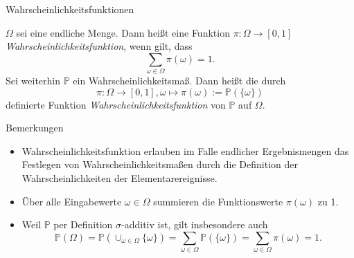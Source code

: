 \documentclass[
  8pt,
  ignorenonframetext,
]{beamer}
\providecommand{\tightlist}{%
  \setlength{\itemsep}{0pt}\setlength{\parskip}{0pt}}
\begin{document}
\begin{frame}{Wahrscheinlichkeitsfunktionen}
\protect\hypertarget{wahrscheinlichkeitsfunktionen}{}
\small
\begin{definition}[Wahrscheinlichkeitsfunktion]
\justifying
$\Omega$ sei eine endliche Menge. Dann heißt eine Funktion $\pi:\Omega \to [0,1]$
\textit{Wahrscheinlichkeitsfunktion}, wenn gilt, dass
\begin{equation}
\sum_{\omega \in \Omega} \pi(\omega) = 1.
\end{equation}
Sei weiterhin $\mathbb{P}$ ein Wahrscheinlichkeitsmaß. Dann heißt die durch
\begin{equation}
\pi : \Omega \to [0,1], \omega \mapsto \pi(\omega) := \mathbb{P}(\{\omega\})
\end{equation}
definierte Funktion \textit{Wahrscheinlichkeitsfunktion} von $\mathbb{P}$ auf $\Omega$.
\end{definition}
\footnotesize

Bemerkungen

\begin{itemize}
\tightlist
\item
  \justifying Wahrscheinlichkeitsfunktion erlauben im Falle endlicher
  Ergebnismengen das Festlegen von Wahrscheinlichkeitsmaßen durch die
  Definition der Wahrscheinlichkeiten der Elementarereignisse.
\item
  Über alle Eingabewerte \(\omega \in \Omega\) summieren die
  Funktionswerte \(\pi(\omega)\) zu 1.
\item
  Weil \(\mathbb{P}\) per Definition \(\sigma\)-additiv ist, gilt
  insbesondere auch \begin{equation}
  \mathbb{P}(\Omega)
  = \mathbb{P}(\cup_{\omega \in \Omega}\{\omega\})
  = \sum_{\omega \in \Omega}\mathbb{P}(\{\omega\})
  = \sum_{\omega \in \Omega}\pi(\omega)
  = 1.
  \end{equation}
\end{itemize}
\end{frame}
\end{document}
